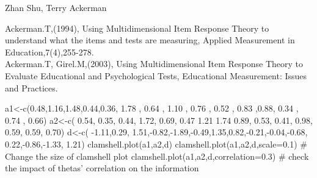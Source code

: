 \begin{Author}\relax
Zhan Shu, Terry Ackerman
\end{Author}
\begin{References}\relax
Ackerman.T,(1994), Using Multidimensional Item Response Theory to understand what the items and tests are measuring, Applied Measurement in Education,7(4),255-278.\\
Ackerman.T, Girel.M,(2003), Using Multidimensional Item Response Theory to Evaluate Educational and Psychological Tests, Educational Measurement: Issues and Practices.
\end{References}
\begin{Examples}
\begin{ExampleCode}
a1<-c(0.48,1.16,1.48,0.44,0.36, 1.78 , 0.64 , 1.10 , 0.76 , 0.52 , 0.83 ,0.88, 0.34 , 0.74 , 0.66)
a2<-c( 0.54, 0.35, 0.44, 1.72, 0.69, 0.47 1.21 1.74 0.89, 0.53, 0.41, 0.98, 0.59, 0.59, 0.70)
d<-c( -1.11,0.29, 1.51,-0.82,-1.89,-0.49,1.35,0.82,-0.21,-0.04,-0.68, 0.22,-0.86,-1.33, 1.21)
clamshell.plot(a1,a2,d)
clamshell.plot(a1,a2,d,scale=0.1) # Change the size of clamshell plot
clamshell.plot(a1,a2,d,correlation=0.3) # check the impact of thetas' correlation on the information 
\end{ExampleCode}
\end{Examples}

